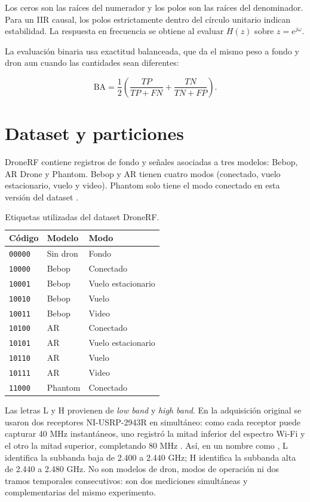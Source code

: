 \documentclass[11pt,a4paper]{article}
\begin{document}
Los ceros son las raíces del numerador y los polos son las raíces del denominador. Para un
IIR causal, los polos estrictamente dentro del círculo unitario indican estabilidad. La
respuesta en frecuencia se obtiene al evaluar $H(z)$ sobre $z=e^{j\omega}$.

La evaluación binaria usa exactitud balanceada, que da el mismo peso a fondo y dron aun
cuando las cantidades sean diferentes:

\begin{equation}
\mathrm{BA}=\frac{1}{2}\left(\frac{TP}{TP+FN}+\frac{TN}{TN+FP}\right).
\end{equation}

\section{Dataset y particiones}

DroneRF contiene registros de fondo y señales asociadas a tres modelos: Bebop, AR Drone
y Phantom. Bebop y AR tienen cuatro modos (conectado, vuelo estacionario, vuelo y video). Phantom
solo tiene el modo conectado en esta versión del dataset \cite{alsaad,dronerf}.

\begin{table}[H]
\centering
\caption{Etiquetas utilizadas del dataset DroneRF.}
\begin{tabular}{lll}
\toprule
Código & Modelo & Modo \\
\midrule
\texttt{00000} & Sin dron & Fondo \\
\texttt{10000} & Bebop & Conectado \\
\texttt{10001} & Bebop & Vuelo estacionario \\
\texttt{10010} & Bebop & Vuelo \\
\texttt{10011} & Bebop & Video \\
\texttt{10100} & AR & Conectado \\
\texttt{10101} & AR & Vuelo estacionario \\
\texttt{10110} & AR & Vuelo \\
\texttt{10111} & AR & Video \\
\texttt{11000} & Phantom & Conectado \\
\bottomrule
\end{tabular}
\end{table}

Las letras L y H provienen de \emph{low band} y \emph{high band}. En la adquisición
original se usaron dos receptores NI-USRP-2943R en simultáneo: como cada receptor puede
capturar 40 MHz instantáneos, uno registró la mitad inferior del espectro Wi-Fi y el otro
la mitad superior, completando 80 MHz \cite{alsaad}. Así, en un nombre como
, L identifica la subbanda baja de 2.400 a 2.440 GHz; H identifica la
subbanda alta de 2.440 a 2.480 GHz. No son modelos de dron, modos de operación ni dos
tramos temporales consecutivos: son dos mediciones simultáneas y complementarias del mismo
experimento.
\end{document}
